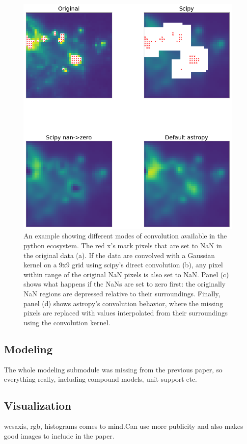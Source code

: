 \documentclass[modern]{aastex61}
\begin{document}
\begin{figure}
\includegraphics[width=\textwidth]{convolution_example.png}
An example showing different modes of convolution available in the python ecosystem.  The red x's mark pixels that are set to NaN in the original data (a).  If the data are convolved with a Gaussian kernel on a 9x9 grid using scipy's direct convolution (b), any pixel within range of the original NaN pixels is also set to NaN.  Panel (c) shows what happens if the NaNs are set to zero first: the originally NaN regions are depressed relative to their surroundings.  Finally, panel (d) shows astropy's convolution behavior, where the missing pixels are replaced with values interpolated from their surroundings using the convolution kernel.
\end{figure}


\subsection{Modeling}
The whole modeling submodule was missing from the previous paper, so everything really, including compound models, unit support etc.

\subsection{Visualization}
wcsaxis, rgb, histograms comes to mind.Can use more publicity and also makes good images to include in the paper.
\end{document}
